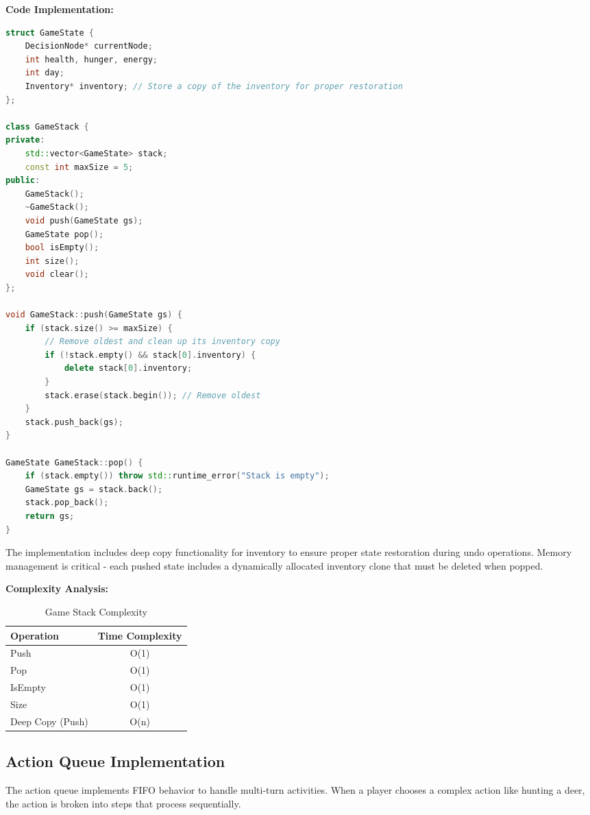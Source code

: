 \documentclass[12pt,a4paper]{article}
\begin{document}
\textbf{Code Implementation:}
\begin{lstlisting}[language=C++, caption={Game Stack with Deep Copy Push Operation}]
struct GameState {
    DecisionNode* currentNode;
    int health, hunger, energy;
    int day;
    Inventory* inventory; // Store a copy of the inventory for proper restoration
};

class GameStack {
private:
    std::vector<GameState> stack;
    const int maxSize = 5;
public:
    GameStack();
    ~GameStack();
    void push(GameState gs);
    GameState pop();
    bool isEmpty();
    int size();
    void clear();
};

void GameStack::push(GameState gs) {
    if (stack.size() >= maxSize) {
        // Remove oldest and clean up its inventory copy
        if (!stack.empty() && stack[0].inventory) {
            delete stack[0].inventory;
        }
        stack.erase(stack.begin()); // Remove oldest
    }
    stack.push_back(gs);
}

GameState GameStack::pop() {
    if (stack.empty()) throw std::runtime_error("Stack is empty");
    GameState gs = stack.back();
    stack.pop_back();
    return gs;
}
\end{lstlisting}

The implementation includes deep copy functionality for inventory to ensure proper state restoration during undo operations. Memory management is critical - each pushed state includes a dynamically allocated inventory clone that must be deleted when popped.

\textbf{Complexity Analysis:}
\begin{table}[h]
	\centering
	\caption{Game Stack Complexity}
	\begin{tabular}{@{}lc@{}}
		\toprule
		\textbf{Operation} & \textbf{Time Complexity} \\ \midrule
		Push               & O(1)                     \\
		Pop                & O(1)                     \\
		IsEmpty            & O(1)                     \\
		Size               & O(1)                     \\
		Deep Copy (Push)   & O(n)                     \\
		\bottomrule
	\end{tabular}
\end{table}

\subsection{Action Queue Implementation}
The action queue implements FIFO behavior to handle multi-turn activities. When a player chooses a complex action like hunting a deer, the action is broken into steps that process sequentially.
\end{document}

